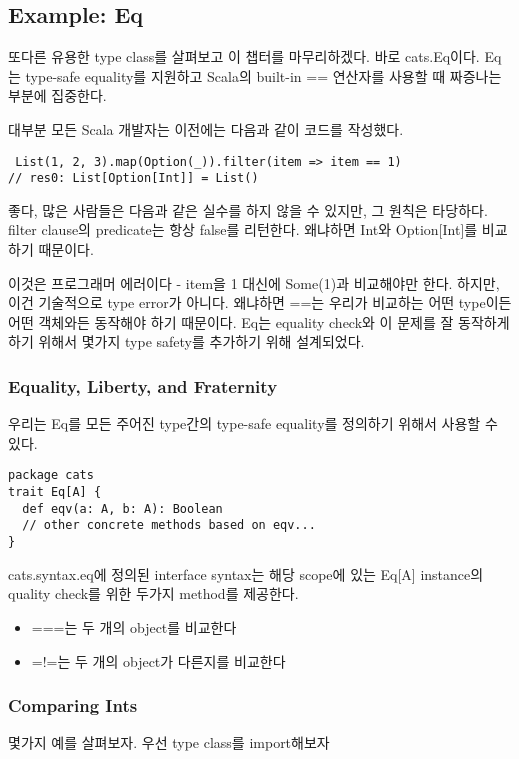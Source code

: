 \documentclass[a4paper]{article}
\begin{document}
\subsection{Example: Eq}
\label{sec:org8d9fe4d}
또다른 유용한 type class를 살펴보고 이 챕터를 마무리하겠다. 바로 cats.Eq이다. Eq는 type-safe equality를 지원하고 Scala의 built-in == 연산자를 사용할 때 짜증나는 부분에 집중한다. 

대부분 모든 Scala 개발자는 이전에는 다음과 같이 코드를 작성했다.

\begin{verbatim}
 List(1, 2, 3).map(Option(_)).filter(item => item == 1)
// res0: List[Option[Int]] = List()
\end{verbatim}

좋다, 많은 사람들은 다음과 같은 실수를 하지 않을 수 있지만, 그 원칙은 타당하다. filter clause의 predicate는 항상 false를 리턴한다. 왜냐하면 Int와 Option[Int]를 비교하기 때문이다.

이것은 프로그래머 에러이다 - item을 1 대신에 Some(1)과 비교해야만 한다. 하지만, 이건 기술적으로 type error가 아니다. 왜냐하면 ==는 우리가 비교하는 어떤 type이든 어떤 객체와든 동작해야 하기 때문이다. Eq는 equality check와 이 문제를 잘 동작하게 하기 위해서 몇가지 type safety를 추가하기 위해 설계되었다.

\subsubsection{Equality, Liberty, and Fraternity}
\label{sec:orgd9a03d0}
우리는 Eq를 모든 주어진 type간의 type-safe equality를 정의하기 위해서 사용할 수 있다.

\begin{verbatim}
package cats
trait Eq[A] {
  def eqv(a: A, b: A): Boolean
  // other concrete methods based on eqv...
}
\end{verbatim}

cats.syntax.eq에 정의된 interface syntax는 해당 scope에 있는 Eq[A] instance의 quality check를 위한 두가지 method를 제공한다.

\begin{itemize}
\item ===는 두 개의 object를 비교한다
\item =!=는 두 개의 object가 다른지를 비교한다
\end{itemize}

\subsubsection{Comparing Ints}
\label{sec:orgb387646}
몇가지 예를 살펴보자. 우선 type class를 import해보자
\end{document}
